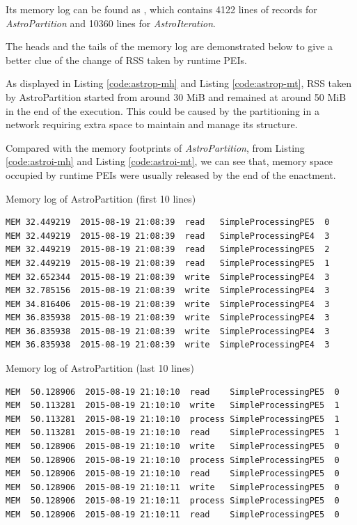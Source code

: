 \documentclass[10pt,twoside,openright,logo]{report}
\begin{document}
Its memory log can be found as \textit{}, which contains 4122 lines of records for \textit{AstroPartition} and 10360 lines for \textit{AstroIteration}.

The heads and the tails of the memory log are demonstrated below to give a better clue of the change of RSS taken by runtime PEIs.

As displayed in Listing \ref{code:astrop-mh} and Listing \ref{code:astrop-mt}, RSS taken by AstroPartition started from around 30 MiB and remained at around 50 MiB in the end of the execution. This could be caused by the partitioning in a network requiring extra space to maintain and manage its structure.

Compared with the memory footprints of \textit{AstroPartition}, from Listing \ref{code:astroi-mh} and Listing \ref{code:astroi-mt}, we can see that, memory space occupied by runtime PEIs were usually released by the end of the enactment.

\begin{listing}
\caption{Memory log of AstroPartition (first 10 lines)}
\label{code:astrop-mh}
\begin{verbatim}
MEM 32.449219  2015-08-19 21:08:39  read   SimpleProcessingPE5  0
MEM 32.449219  2015-08-19 21:08:39  read   SimpleProcessingPE4  3
MEM 32.449219  2015-08-19 21:08:39  read   SimpleProcessingPE5  2
MEM 32.449219  2015-08-19 21:08:39  read   SimpleProcessingPE5  1
MEM 32.652344  2015-08-19 21:08:39  write  SimpleProcessingPE4  3
MEM 32.785156  2015-08-19 21:08:39  write  SimpleProcessingPE4  3
MEM 34.816406  2015-08-19 21:08:39  write  SimpleProcessingPE4  3
MEM 36.835938  2015-08-19 21:08:39  write  SimpleProcessingPE4  3
MEM 36.835938  2015-08-19 21:08:39  write  SimpleProcessingPE4  3
MEM 36.835938  2015-08-19 21:08:39  write  SimpleProcessingPE4  3
\end{verbatim}
\end{listing}

\begin{listing}
\caption{Memory log of AstroPartition (last 10 lines)}
\label{code:astrop-mt}
\begin{verbatim}
MEM  50.128906  2015-08-19 21:10:10  read    SimpleProcessingPE5  0
MEM  50.113281  2015-08-19 21:10:10  write   SimpleProcessingPE5  1
MEM  50.113281  2015-08-19 21:10:10  process SimpleProcessingPE5  1
MEM  50.113281  2015-08-19 21:10:10  read    SimpleProcessingPE5  1
MEM  50.128906  2015-08-19 21:10:10  write   SimpleProcessingPE5  0
MEM  50.128906  2015-08-19 21:10:10  process SimpleProcessingPE5  0
MEM  50.128906  2015-08-19 21:10:10  read    SimpleProcessingPE5  0
MEM  50.128906  2015-08-19 21:10:11  write   SimpleProcessingPE5  0
MEM  50.128906  2015-08-19 21:10:11  process SimpleProcessingPE5  0
MEM  50.128906  2015-08-19 21:10:11  read    SimpleProcessingPE5  0
\end{verbatim}
\end{listing}
\end{document}
